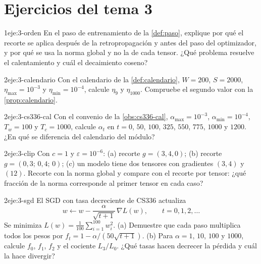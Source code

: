 \section*{Ejercicios del tema 3}

\begin{ejercicio}{1}{eje:3-orden}
En el paso de entrenamiento de la \cref{def:paso}, explique por qué el recorte se aplica después de la retropropagación y antes del paso del optimizador, y por qué se usa la norma global y no la de cada tensor. ¿Qué problema resuelve el calentamiento y cuál el decaimiento coseno?
\end{ejercicio}

\begin{ejercicio}{2}{eje:3-calendario}
Con el calendario de la \cref{def:calendario}, $W=200$, $S=2000$, $\eta_{\max}=10^{-3}$ y $\eta_{\min}=10^{-4}$, calcule $\eta_9$ y $\eta_{1000}$. Compruebe el segundo valor con la \cref{prop:calendario}.
\end{ejercicio}

\begin{ejercicio}{2}{eje:3-cs336-cal}
Con el convenio de la \cref{obs:cs336-cal}, $\alpha_{\max}=10^{-3}$, $\alpha_{\min}=10^{-4}$, $T_w=100$ y $T_c=1000$, calcule $\alpha_t$ en $t=0$, $50$, $100$, $325$, $550$, $775$, $1000$ y $1200$. ¿En qué se diferencia del calendario del módulo?
\end{ejercicio}

\begin{ejercicio}{2}{eje:3-clip}
Con $c=1$ y $\varepsilon=10^{-6}$: (a) recorte $g=(3,4,0)$; (b) recorte $g=(0{,}3;\allowbreak\,0{,}4;\allowbreak\,0)$; (c) un modelo tiene dos tensores con gradientes $(3,4)$ y $(12)$. Recorte con la norma global y compare con el recorte por tensor: ¿qué fracción de la norma corresponde al primer tensor en cada caso?
\end{ejercicio}

\begin{ejercicio}{2}{eje:3-sgd}
El SGD con tasa decreciente de CS336 actualiza
\[
w\leftarrow w-\frac{\alpha}{\sqrt{t+1}}\,\nabla L(w),\qquad t=0,1,2,\dots
\]
Se minimiza $L(w)=\frac{1}{100}\sum_{i=1}^{100}w_i^{2}$. (a) Demuestre que cada paso multiplica todos los pesos por $f_t=1-\alpha/(50\sqrt{t+1})$. (b) Para $\alpha=1$, $10$, $100$ y $1000$, calcule $f_0$, $f_1$, $f_2$ y el cociente $L_3/L_0$. ¿Qué tasas hacen decrecer la pérdida y cuál la hace divergir?
\end{ejercicio}

